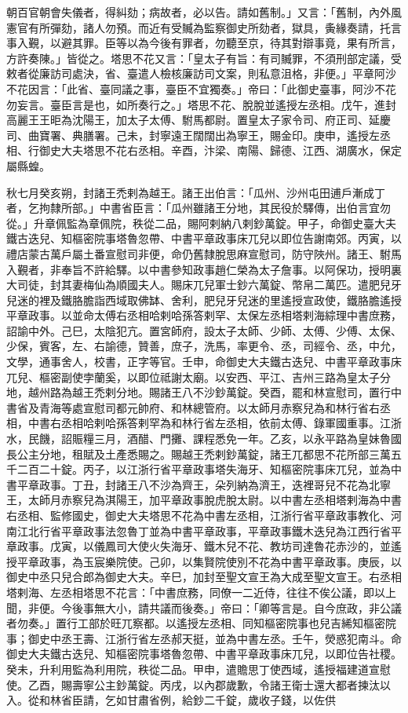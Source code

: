 \begin{pinyinscope}
朝百官朝會失儀者，得糾劾；病故者，必以告。請如舊制。」又言：「舊制，內外風憲官有所彈劾，諸人勿預。而近有受贓為監察御史所劾者，獄具，夤緣奏請，托言事入覲，以避其罪。臣等以為今後有罪者，勿聽至京，待其對辯事竟，果有所言，方許奏陳。」皆從之。塔思不花又言：「皇太子有旨：有司贓罪，不須刑部定議，受敕者從廉訪司處決，省、臺遣人檢核廉訪司文案，則私意沮格，非便。」平章阿沙不花因言：「此省、臺同議之事，臺臣不宜獨奏。」帝曰：「此御史臺事，阿沙不花勿妄言。臺臣言是也，如所奏行之。」塔思不花、脫脫並遙授左丞相。戊午，進封高麗王王昛為沈陽王，加太子太傅、駙馬都尉。置皇太子家令司、府正司、延慶司、曲寶署、典膳署。己未，封寧遠王闊闊出為寧王，賜金印。庚申，遙授左丞相、行御史大夫塔思不花右丞相。辛酉，汴梁、南陽、歸德、江西、湖廣水，保定屬縣蝗。



 秋七月癸亥朔，封諸王禿剌為越王。諸王出伯言：「瓜州、沙州屯田逋戶漸成丁者，乞拘隸所部。」中書省臣言：「瓜州雖諸王分地，其民役於驛傳，出伯言宜勿從。」升章佩監為章佩院，秩從二品，賜阿剌納八剌鈔萬錠。甲子，命御史臺大夫鐵古迭兒、知樞密院事塔魯忽帶、中書平章政事床兀兒以即位告謝南郊。丙寅，以禮店蒙古萬戶屬土番宣慰司非便，命仍舊隸脫思麻宣慰司，防守陜州。諸王、駙馬入覲者，非奉旨不許給驛。以中書參知政事趙仁榮為太子詹事。以阿保功，授明裏大司徒，封其妻梅仙為順國夫人。賜床兀兒軍士鈔六萬錠、幣帛二萬匹。遣肥兒牙兒迷的裡及鐵胳膽詣西域取佛缽、舍利，肥兒牙兒迷的里遙授宣政使，鐵胳膽遙授平章政事。以並命太傅右丞相哈剌哈孫答剌罕、太保左丞相塔剌海綜理中書庶務，詔諭中外。己巳，太陰犯亢。置宮師府，設太子太師、少師、太傅、少傅、太保、少保，賓客，左、右諭德，贊善，庶子，洗馬，率更令、丞，司經令、丞，中允，文學，通事舍人，校書，正字等官。壬申，命御史大夫鐵古迭兒、中書平章政事床兀兒、樞密副使孛蘭奚，以即位祗謝太廟。以安西、平江、吉州三路為皇太子分地，越州路為越王禿剌分地。賜諸王八不沙鈔萬錠。癸酉，罷和林宣慰司，置行中書省及青海等處宣慰司都元帥府、和林總管府。以太師月赤察兒為和林行省右丞相，中書右丞相哈剌哈孫答剌罕為和林行省左丞相，依前太傅、錄軍國重事。江浙水，民饑，詔賑糧三月，酒醋、門攤、課程悉免一年。乙亥，以永平路為皇妹魯國長公主分地，租賦及土產悉賜之。賜越王禿剌鈔萬錠，諸王兀都思不花所部三萬五千二百二十錠。丙子，以江浙行省平章政事塔失海牙、知樞密院事床兀兒，並為中書平章政事。丁丑，封諸王八不沙為齊王，朵列納為濟王，迭裡哥兒不花為北寧王，太師月赤察兒為淇陽王，加平章政事脫虎脫太尉。以中書左丞相塔剌海為中書右丞相、監修國史，御史大夫塔思不花為中書左丞相，江浙行省平章政事教化、河南江北行省平章政事法忽魯丁並為中書平章政事，平章政事鐵木迭兒為江西行省平章政事。戊寅，以儀鳳司大使火失海牙、鐵木兒不花、教坊司達魯花赤沙的，並遙授平章政事，為玉宸樂院使。己卯，以集賢院使別不花為中書平章政事。庚辰，以御史中丞只兒合郎為御史大夫。辛巳，加封至聖文宣王為大成至聖文宣王。右丞相塔剌海、左丞相塔思不花言：「中書庶務，同僚一二近侍，往往不俟公議，即以上聞，非便。今後事無大小，請共議而後奏。」帝曰：「卿等言是。自今庶政，非公議者勿奏。」置行工部於旺兀察都。以遙授左丞相、同知樞密院事也兒吉絺知樞密院事；御史中丞王壽、江浙行省左丞郝天挺，並為中書左丞。壬午，熒惑犯南斗。命御史大夫鐵古迭兒、知樞密院事塔魯忽帶、中書平章政事床兀兒，以即位告社稷。癸未，升利用監為利用院，秩從二品。甲申，遣贍思丁使西域，遙授福建道宣慰使。乙酉，賜壽寧公主鈔萬錠。丙戌，以內郡歲歉，令諸王衛士還大都者揀汰以入。從和林省臣請，乞如甘肅省例，給鈔二千錠，歲收子錢，以佐供
\end{pinyinscope}
